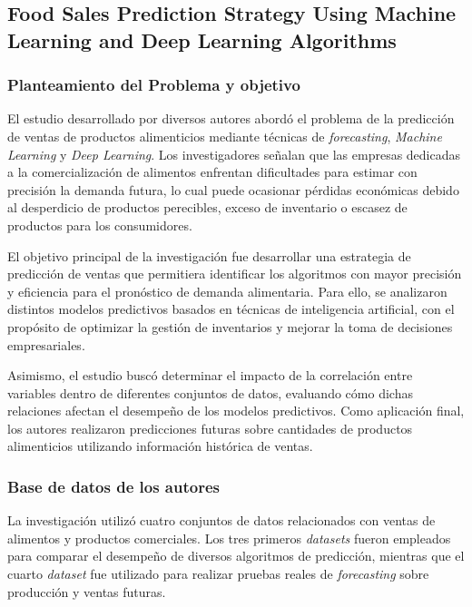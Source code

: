 
\subsection{Food Sales Prediction Strategy Using Machine Learning and Deep Learning Algorithms \citep{foodsales2023}}
\subsubsection{Planteamiento del Problema y objetivo}

El estudio desarrollado por diversos autores abordó el problema de la predicción de ventas de productos alimenticios mediante técnicas de \textit{forecasting}, \textit{Machine Learning} y \textit{Deep Learning}. Los investigadores señalan que las empresas dedicadas a la comercialización de alimentos enfrentan dificultades para estimar con precisión la demanda futura, lo cual puede ocasionar pérdidas económicas debido al desperdicio de productos perecibles, exceso de inventario o escasez de productos para los consumidores.

El objetivo principal de la investigación fue desarrollar una estrategia de predicción de ventas que permitiera identificar los algoritmos con mayor precisión y eficiencia para el pronóstico de demanda alimentaria. Para ello, se analizaron distintos modelos predictivos basados en técnicas de inteligencia artificial, con el propósito de optimizar la gestión de inventarios y mejorar la toma de decisiones empresariales.

Asimismo, el estudio buscó determinar el impacto de la correlación entre variables dentro de diferentes conjuntos de datos, evaluando cómo dichas relaciones afectan el desempeño de los modelos predictivos. Como aplicación final, los autores realizaron predicciones futuras sobre cantidades de productos alimenticios utilizando información histórica de ventas.


\subsubsection{Base de datos de los autores}

La investigación utilizó cuatro conjuntos de datos relacionados con ventas de alimentos y productos comerciales. Los tres primeros \textit{datasets} fueron empleados para comparar el desempeño de diversos algoritmos de predicción, mientras que el cuarto \textit{dataset} fue utilizado para realizar pruebas reales de \textit{forecasting} sobre producción y ventas futuras.


